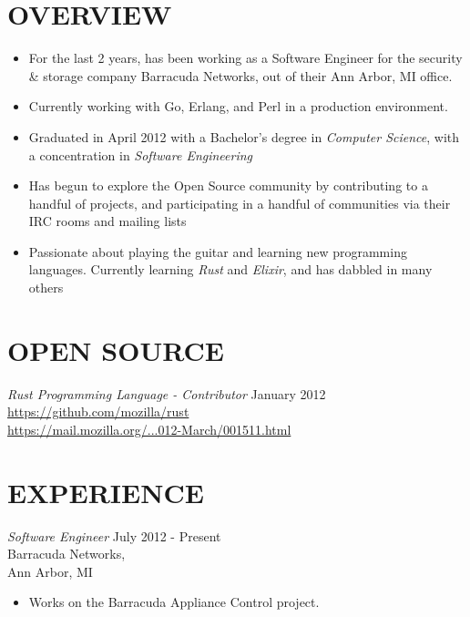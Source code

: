 \documentclass[line,margin]{res}
\begin{document}

\address{1450 Schafer Drive, Burton, MI 48509}
\address{pwoolcoc@gmail.com\ -\ (810) 412-8642}


\begin{resume}


\section{OVERVIEW}
    \begin{itemize}
        \item For the last 2 years, has been working as a Software Engineer
              for the security \& storage company Barracuda Networks,
              out of their Ann Arbor, MI office.
        \item Currently working with Go, Erlang, and Perl in a production environment.
        \item Graduated in April 2012 with a Bachelor's degree in
              {\sl Computer Science}, with a concentration in
              {\sl Software Engineering}
        \item Has begun to explore the Open Source community by contributing to
              a handful of projects, and participating in a handful
              of communities via their IRC rooms and mailing lists
        \item Passionate about playing the guitar and learning new programming
              languages. Currently learning {\sl Rust} and {\sl Elixir},
              and has dabbled in many others
    \end{itemize}



\section{OPEN SOURCE}
        {\sl Rust Programming Language - Contributor } \hfill January 2012 \\
              \href{https://github.com/mozilla/rust}{https://github.com/mozilla/rust} \\
              \href{https://mail.mozilla.org/pipermail/rust-dev/2012-March/001511.html}{https://mail.mozilla.org/...012-March/001511.html}

\section{EXPERIENCE}
    {\sl Software Engineer }
            \hfill July 2012 - Present \\
                    Barracuda Networks, \\
                    Ann Arbor, MI
        \begin{itemize}
            \item Works on the Barracuda Appliance Control project.
        \end{itemize}


\end{resume}
\end{document}
